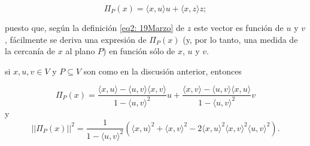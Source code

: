 \begin{equation}
\label{eq1: 19Marzo}
\Pi_{P}(x)= \langle x, u \rangle u + \langle x, z \rangle z;
\end{equation}

puesto que, según la definición \eqref{eq2: 19Marzo} de 
$z$ este vector es función de $u$ y $v$, fácilmente se
deriva una expresión de $\Pi_{P}(x)$ (y, por lo tanto, una
medida de la cercanía de $x$ al plano $P$) en función sólo
de $x$, $u$ y $v$.

	\begin{prop}
	\label{prop: formulas 20Marzo}
	si $x, u, v \in V$ y $P \subseteq V$ son como en la discusión anterior,
	entonces 

		\begin{equation}
		\label{eq3: 19Marzo}
		\Pi_{P}(x)= \frac{\langle x, u \rangle -\langle u, v \rangle \langle x, v \rangle }{1-\langle u, v \rangle^{2}} u + \frac{\langle x, v \rangle -\langle u, v \rangle \langle x, u \rangle }{1-\langle u, v \rangle^{2}} v
		\end{equation}
	y 
		\begin{equation}
		\label{eq3: 19Marzo}
		  || \Pi_{P}(x) ||^{2}=
		  \frac{1}{1- \langle u, v \rangle^{2}} \left(  
	       \langle x, u \rangle^{2} +  \langle x, v \rangle^{2}	
	       -2  \langle x, u \rangle^{2} \langle x, v \rangle^{2} \langle u, v \rangle^{2}	  
		  \right).
		\end{equation}
 
	\end{prop}

